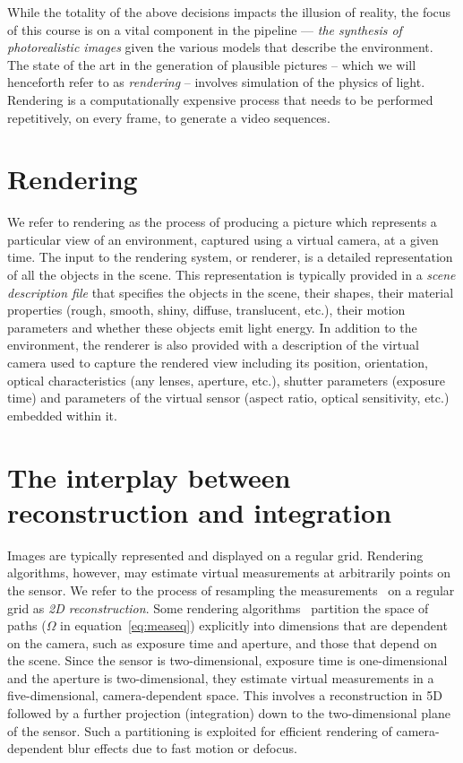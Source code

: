 \documentclass[11pt,fleqn]{book} %
\newcommand{\TBC} {\vspace {1em} \noindent [TO BE COMPLETED IN THE FINAL VERSION.] \vspace {1em}}
\begin{document}
While the totality of the above decisions impacts the illusion of reality, the focus of this course is on a vital component in the pipeline --- \textit{the synthesis of photorealistic images} given the various models that describe the environment. The state of the art in the generation of plausible pictures -- which we will henceforth refer to as \textit{rendering} --  involves simulation of the physics of light.
Rendering is a computationally expensive process that needs to be performed repetitively, on every frame, to generate a video sequences.



\section{Rendering}
We refer to rendering as the process of producing a picture which represents a particular view of an environment, captured using a virtual camera, at a given time. The input to the rendering system, or renderer, is a detailed representation of all the objects in the scene. This representation is typically provided in a \textit{scene description file} that specifies the objects in the scene, their shapes, their material properties (rough, smooth, shiny, diffuse, translucent, etc.), their motion parameters and whether these objects emit light energy. In addition to the environment, the renderer is also provided with a description of the virtual camera used to capture the rendered view including its position, orientation, optical characteristics (any lenses, aperture, etc.), shutter parameters (exposure time)  and parameters of the virtual sensor (aspect ratio, optical sensitivity, etc.) embedded within it. 



\TBC

\section{The interplay between reconstruction and integration}
Images are typically represented and displayed on a regular grid. Rendering algorithms, however, may estimate virtual measurements at arbitrarily points on the sensor. We refer to the process of resampling the measurements \Ij{}\ on a regular grid as \textit{2D reconstruction}. Some rendering algorithms~\cite{MDAS,Egan09,Soleretal09} partition the space of paths ($\Omega$ in equation~\ref{eq:measeq}) explicitly into dimensions that are dependent on the camera, such as exposure time and aperture, and those that depend on the scene. Since the sensor is two-dimensional, exposure time is one-dimensional and the aperture is two-dimensional, they estimate virtual measurements in a five-dimensional, camera-dependent space. This involves a reconstruction in 5D followed by a further projection (integration) down to the two-dimensional plane of the sensor. Such a partitioning is exploited for efficient rendering of camera-dependent blur effects due to fast motion or defocus.
\end{document}
